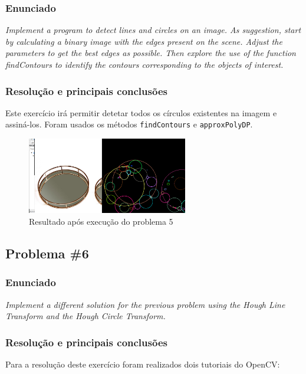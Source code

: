 \documentclass[portuguese, times, mirror]{revdetua}
\begin{document}
\subsubsection{Enunciado}
\textit{Implement a program to detect lines and circles on an image. As suggestion, start by calculating a binary image with the edges present on the scene. Adjust the parameters to get the best edges as possible. Then explore the use of the function findContours to identify the contours
corresponding to the objects of interest.}

\subsubsection{Resolução e principais conclusões}

Este exercício irá permitir detetar todos os círculos existentes na imagem e assiná-los. Foram usados os métodos \texttt{findContours} e \texttt{approxPolyDP}. 



\begin{figure}[ht!]
\centering
\includegraphics[width=70mm]{img/ex5.png}
\caption{Resultado após execução do problema 5 }
\end{figure}

\subsection{Problema \#6}

\subsubsection{Enunciado}
\textit{Implement a different solution for the previous problem using the Hough Line Transform and the Hough Circle Transform.}

\subsubsection{Resolução e principais conclusões}

Para a resolução deste exercício foram realizados dois tutoriais do OpenCV: 
\end{document}

